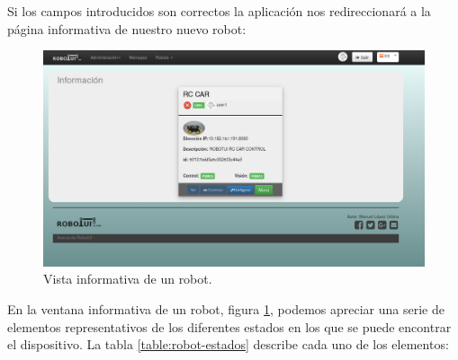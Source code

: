 Si los campos introducidos son correctos la aplicación nos redireccionará a la página informativa de nuestro nuevo robot:\\

\begin{figure}[H]
  \begin{center}
    \includegraphics[scale=0.3]{imagenes/manual-usuario/show-robot.png}
  \end{center}
  \caption{Vista informativa de un robot.}
  \label{website:show-robot}
\end{figure}

En la ventana informativa de un robot, figura \ref{website:show-robot}, podemos apreciar una serie de elementos representativos de los diferentes estados en los que se puede encontrar el dispositivo. La 
tabla \ref{table:robot-estados} describe cada uno de los elementos:\\

